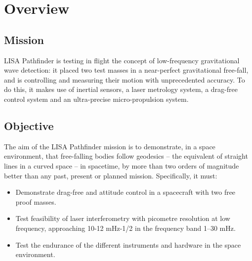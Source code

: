 \documentclass[11pt,fleqn]{book} %
\begin{document}
\cleardoublepage %

\pagestyle{fancy} %



\chapter{Overview}

\section{Mission}
LISA Pathfinder is testing in flight the concept of low-frequency gravitational wave detection: it placed two test masses in a near-perfect gravitational free-fall, and is controlling and measuring their motion with unprecedented accuracy. To do this, it makes use of inertial sensors, a laser metrology system, a drag-free control system and an ultra-precise micro-propulsion system.

\section{Objective}
The aim of the LISA Pathfinder mission is to demonstrate, in a space environment, that free-falling bodies follow geodesics – the equivalent of straight lines in a curved space – in spacetime, by more than two orders of magnitude better than any past, present or planned mission. Specifically, it must:
\begin{itemize}
\item Demonstrate drag-free and attitude control in a spacecraft with two free proof masses.
\item Test feasibility of laser interferometry with picometre resolution at low frequency, approaching 10-12 mHz-1/2 in the frequency band 1–30 mHz.
\item Test the endurance of the different instruments and hardware in the space environment.
\end{itemize}
\end{document}
